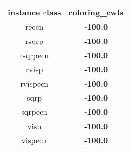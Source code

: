 \begin{tabular}{c|c}
instance class & coloring\_cwls \\ 
\hline
reecn        & {\bf -100.0} \\ 
rsqrp        & {\bf -100.0} \\ 
rsqrpecn     & {\bf -100.0} \\ 
rvisp        & {\bf -100.0} \\ 
rvispecn     & {\bf -100.0} \\ 
sqrp         & {\bf -100.0} \\ 
sqrpecn      & {\bf -100.0} \\ 
visp         & {\bf -100.0} \\ 
vispecn      & {\bf -100.0} \\ 
\end{tabular}